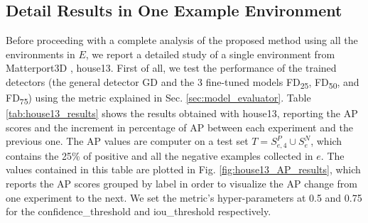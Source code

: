 \subsection{Detail Results in One Example Environment}

Before proceeding with a complete analysis of the proposed method using all the environments in $E$, we report a detailed study of a single environment from Matterport3D \cite{matterport}, \textsf{house13}. First of all, we test the performance of the trained detectors (the general detector \textsf{GD} and the 3 fine-tuned models \textsf{FD\textsubscript{25}}, \textsf{FD\textsubscript{50}}, and \textsf{FD\textsubscript{75}}) using the metric explained in Sec. \ref{sec:model_evaluator}. Table \ref{tab:house13_results} shows the results obtained with \textsf{house13}, reporting the AP scores and the increment in percentage of AP between each experiment and the previous one. The AP values are computer on a test set $T = S^{P}_{e, 4} \cup S^{N}_{e}$, which contains the 25\% of positive and all the negative examples collected in $e$. The values contained in this table are plotted in Fig. \ref{fig:house13_AP_results}, which reports the AP scores grouped by label in order to visualize the AP change from one experiment to the next. We set the metric's hyper-parameters at 0.5 and 0.75 for the \textsf{confidence\_threshold} and \textsf{iou\_threshold} respectively.

